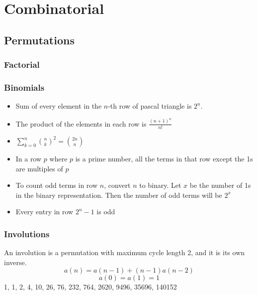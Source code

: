 \newcommand*{\Comb}[2]{{}^{#1}C_{#2}}%
\newcommand{\stirlingfirst}[2]{\genfrac{[}{]}{0pt}{}{#1}{#2}}
\newcommand{\stirlingsecond}[2]{\genfrac{\{}{\}}{0pt}{}{#1}{#2}}

\chapter{Combinatorial}

\section{Permutations}
	\subsection{Factorial}
		 

\subsection{Binomials}
	\begin{itemize}
	\item Sum of every element in the $n$-th row of pascal triangle is $2^n$.
	\item The product of the elements in each row is $\frac{(n + 1)^n}{n!}$
	\item $\sum_{k = 0}^{n} \binom{n}{k}^2 = \binom{2n}{n}$
	\item In a row $p$ where $p$ is a prime number, all the terms in that row except the 1s are multiples of $p$
	\item To count odd terms in row $n$, convert $n$ to binary. Let $x$ be the number of 1s in the binary representation. Then the number of odd terms will be $2^x$
	\item Every entry in row $2^n - 1$ is odd
	\end{itemize}




\subsection{Involutions}
    An involution is a permutation with maximum cycle length 2, and it is its own inverse. 
    $$a(n) = a(n-1) + (n-1)a(n-2)$$
    $$a(0) = a(1) = 1$$
    1, 1, 2, 4, 10, 26, 76, 232, 764, 2620, 9496, 35696, 140152\\


